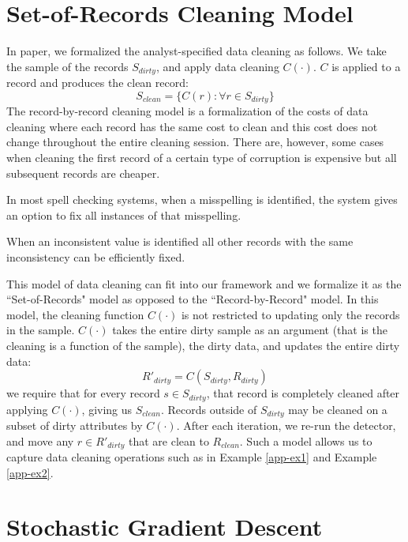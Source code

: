 \section{Set-of-Records Cleaning Model}\label{set-of-r}
In paper, we formalized the analyst-specified data cleaning as follows.
We take the sample of the records $S_{dirty}$, and apply data cleaning $C(\cdot)$.
$C$ is applied to a record and produces the clean record:
\[
S_{clean} = \{C(r) : \forall r \in S_{dirty}\}
\]
The record-by-record cleaning model is a formalization of the costs of data cleaning where each record has the same cost to clean and this cost does not change throughout the entire cleaning session.
There are, however, some cases when cleaning the first record of a certain type of corruption is expensive but all subsequent records are cheaper.

\begin{example}\label{app-ex1}
In most spell checking systems, when a misspelling is identified, the system gives an option to fix all instances of that misspelling.
\end{example}

\begin{example}\label{app-ex2}
When an inconsistent value is identified all other records with the same inconsistency can be efficiently fixed.
\end{example}

This model of data cleaning can fit into our framework and we formalize it as the ``Set-of-Records" model as opposed to the ``Record-by-Record" model. 
In this model, the cleaning function $C(\cdot)$ is not restricted to updating only the records in the sample.
$C(\cdot)$ takes the entire dirty sample as an argument (that is the cleaning is a function of the sample), the dirty data, and updates the entire dirty data:
\[
R'_{dirty} = C(S_{dirty},R_{dirty})
\]
we require that for every record $s \in S_{dirty}$, that record is completely cleaned after applying $C(\cdot)$, giving us $S_{clean}$.
Records outside of $S_{dirty}$ may be cleaned on a subset of dirty attributes by $C(\cdot)$.
After each iteration, we re-run the detector, and move any $r \in R'_{dirty}$ that are clean to $R_{clean}$.
Such a model allows us to capture data cleaning operations such as in Example \ref{app-ex1} and Example \ref{app-ex2}.

\section{Stochastic Gradient Descent}\label{appsgd}

